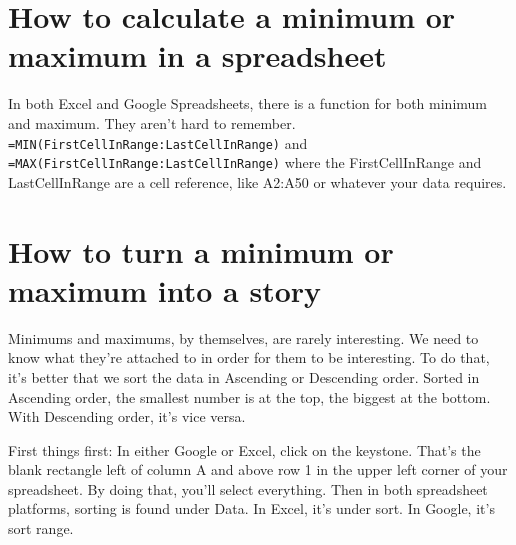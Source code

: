 \documentclass[
]{book}
\begin{document}
\hypertarget{how-to-calculate-a-minimum-or-maximum-in-a-spreadsheet}{%
\section{How to calculate a minimum or maximum in a spreadsheet}\label{how-to-calculate-a-minimum-or-maximum-in-a-spreadsheet}}

In both Excel and Google Spreadsheets, there is a function for both minimum and maximum. They aren't hard to remember. \texttt{=MIN(FirstCellInRange:LastCellInRange)} and \texttt{=MAX(FirstCellInRange:LastCellInRange)} where the FirstCellInRange and LastCellInRange are a cell reference, like A2:A50 or whatever your data requires.

\hypertarget{how-to-turn-a-minimum-or-maximum-into-a-story}{%
\section{How to turn a minimum or maximum into a story}\label{how-to-turn-a-minimum-or-maximum-into-a-story}}

Minimums and maximums, by themselves, are rarely interesting. We need to know what they're attached to in order for them to be interesting. To do that, it's better that we sort the data in Ascending or Descending order. Sorted in Ascending order, the smallest number is at the top, the biggest at the bottom. With Descending order, it's vice versa.

First things first: In either Google or Excel, click on the keystone. That's the blank rectangle left of column A and above row 1 in the upper left corner of your spreadsheet. By doing that, you'll select everything. Then in both spreadsheet platforms, sorting is found under Data. In Excel, it's under sort. In Google, it's sort range.
\end{document}
